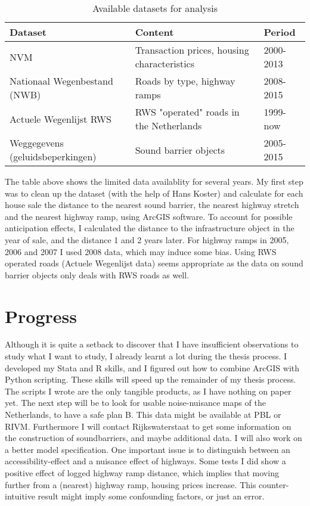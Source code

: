 \documentclass[]{scrartcl}
\begin{document}
\begin{table}[!htbp]
	\centering%
	\caption{Available datasets for analysis}
	\begin{tabular}{|m{} | m{} | m{} |}
		\hline
		\textbf{Dataset} & \textbf{Content} & \textbf{Period}\\
		\hline
		NVM & Transaction prices,  housing characteristics & 2000-2013\\
		\hline
		Nationaal Wegenbestand (NWB) & Roads by type, highway ramps & 2008-2015\\
		\hline
		Actuele Wegenlijst RWS & RWS "operated" roads in the Netherlands & 1999-now\\
		\hline
		Weggegevens (geluidsbeperkingen) & Sound barrier objects & 2005-2015\\
		\hline
	\end{tabular}
\end{table}

The table above shows the limited data availablity for several years. My first step was to clean up the dataset (with the help of Hans Koster) and calculate for each house sale the distance to the nearest sound barrier, the nearest highway stretch and the nearest highway ramp, using ArcGIS software. To account for possible anticipation effects, I calculated the distance to the infrastructure object in the year of sale, and the distance 1 and 2 years later. For highway ramps in 2005, 2006 and 2007 I used 2008 data, which may induce some bias. Using RWS operated roads (Actuele Wegenlijst data) seems appropriate as the data on sound barrier objects only deals with RWS roads as well. 

\section{Progress}

Although it is quite a setback to discover that I have insufficient observations to study what I want to study, I already learnt a lot during the thesis process. I developed my Stata and R skills, and I figured out how to combine ArcGIS with Python scripting. These skills will speed up the remainder of my thesis process. The scripts I wrote are the only tangible products, as I have nothing on paper yet. The next step will be to look for usable noise-nuisance maps of the Netherlands, to have a safe plan B. This data might be available at PBL or RIVM. Furthermore I will contact Rijkswaterstaat to get some information on the construction of soundbarriers, and maybe additional data. I will also work on a better model specification. One important issue is to distinguish between an accessibility-effect and a nuisance effect of highways. Some tests I did show a positive effect of logged highway ramp distance, which implies that moving further from a (nearest) highway ramp, housing prices increase. This counter-intuitive result might imply some confounding factors, or just an error.
\end{document}
